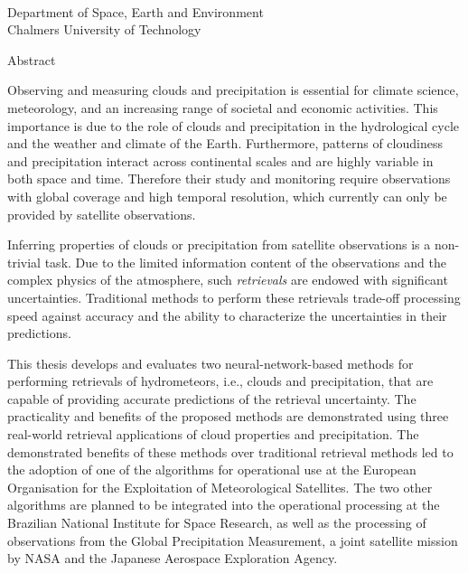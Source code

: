 \thispagestyle{plain}
  {\large \textbf{\thetitle}}
  
  \vspace{0.4cm}
  
  \vspace{0.4cm}
  {\sc \theauthor} \\
  Department of Space, Earth and Environment \\
  Chalmers University of Technology
  
  \vspace{0.5cm}
  {\sc Abstract}
  \vspace{0.5cm}

Observing and measuring clouds and precipitation is essential for
climate science, meteorology, and an increasing range of societal and economic
activities. This importance is due to the role of clouds and precipitation in the
hydrological cycle and the weather and climate of the Earth. Furthermore, patterns of
cloudiness and precipitation interact across continental scales and are highly
variable in both space and time. Therefore their study and monitoring require
observations with global coverage and high temporal resolution, which currently
can only be provided by satellite observations.

Inferring properties of clouds or precipitation from satellite observations is a
non-trivial task. Due to the limited information content of the observations and
the complex physics of the atmosphere, such \textit{retrievals} are endowed with
significant uncertainties. Traditional methods to perform these retrievals trade-off processing speed against accuracy and the ability to characterize the
uncertainties in their predictions.

This thesis develops and evaluates two neural-network-based methods for
performing retrievals of hydrometeors, i.e., clouds and precipitation, that are
capable of providing accurate predictions of the retrieval uncertainty. The
practicality and benefits of the proposed methods are demonstrated using three
real-world retrieval applications of cloud properties and precipitation. The
demonstrated benefits of these methods over traditional retrieval methods
 led to the adoption of one of the algorithms for operational use at the
European Organisation for the Exploitation of Meteorological Satellites. The two
other algorithms are planned to be integrated into the operational processing at
the Brazilian National Institute for Space Research, as well as the processing of
observations from the Global Precipitation Measurement, a joint satellite
mission by NASA and the Japanese Aerospace Exploration Agency.

